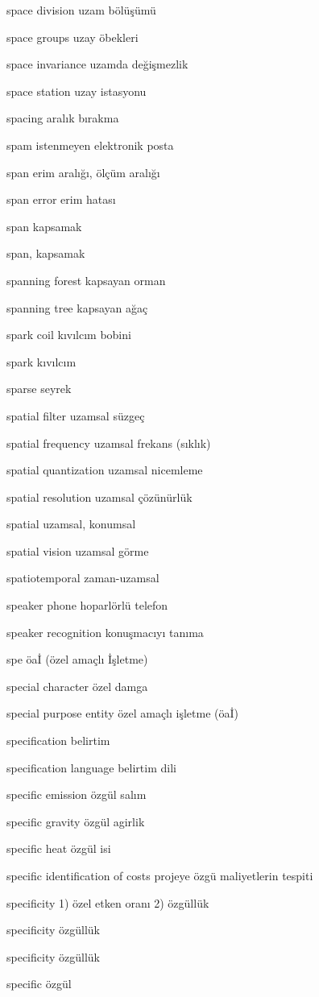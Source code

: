 \documentclass[12pt,fleqn]{article}\usepackage{../../common}
\begin{document}
space division uzam bölüşümü

space groups uzay öbekleri

space invariance uzamda değişmezlik

space station uzay istasyonu

spacing aralık bırakma

spam istenmeyen elektronik posta

span erim aralığı, ölçüm aralığı

span error erim hatası

span kapsamak

span, kapsamak

spanning forest kapsayan orman

spanning tree kapsayan ağaç

spark coil kıvılcım bobini

spark kıvılcım

sparse seyrek

spatial filter uzamsal süzgeç

spatial frequency uzamsal frekans (sıklık)

spatial quantization uzamsal nicemleme

spatial resolution uzamsal çözünürlük

spatial uzamsal, konumsal

spatial vision uzamsal görme

spatiotemporal zaman-uzamsal

speaker phone hoparlörlü telefon

speaker recognition konuşmacıyı tanıma

spe öaİ (özel amaçlı İşletme)

special character özel damga

special purpose entity özel amaçlı işletme (öaİ)

specification belirtim

specification language belirtim dili

specific emission özgül salım

specific gravity özgül agirlik

specific heat özgül isi

specific identification of costs projeye özgü maliyetlerin tespiti

specificity 1) özel etken oranı 2) özgüllük

specificity özgüllük

specificity özgüllük

specific özgül
\end{document}
